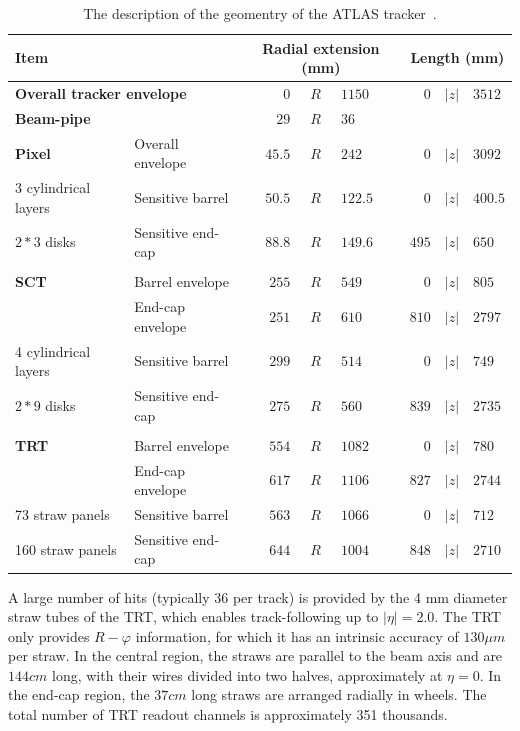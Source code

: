 \begin{table}
\centering
\begin{tabular}{ll | r@{$<$}c@{$<$}l | r@{$<$}c@{$<$}l} \hline\hline
\multicolumn{2}{l|}{\bf Item} & \multicolumn{3}{c|}{\bf Radial extension (mm)} & \multicolumn{3}{c}{\bf Length (mm)} \\\hline
\multicolumn{2}{l|}{\bf Overall tracker envelope} & $0$&$R$&$1150$ & $0$&$|z|$&$3512$ \\
\multicolumn{2}{l|}{\bf Beam-pipe} & $29$&$R$&$36$ & \multicolumn{3}{c}{}\\\hline
{\bf Pixel} & Overall envelope & $45.5$&$R$&$242$ & $0$&$|z|$&$3092$ \\
3 cylindrical layers & Sensitive barrel & $50.5$&$R$&$122.5$ & $0$&$|z|$&$400.5$ \\
$2*3$ disks & Sensitive end-cap & $88.8$&$R$&$149.6$ & $495$&$|z|$&$650$ \\
\multicolumn{2}{l|}{} & \multicolumn{3}{c|}{} & \multicolumn{3}{c}{}\\
{\bf SCT} & Barrel envelope & $255$&$R$&$549$ & $0$&$|z|$&$805$ \\
 & End-cap envelope & $251$&$R$&$610$ & $810$&$|z|$&$2797$ \\
4 cylindrical layers & Sensitive barrel & $299$&$R$&$514$ & $0$&$|z|$&$749$ \\
$2*9$ disks & Sensitive end-cap & $275$&$R$&$560$ & $839$&$|z|$&$2735$ \\
\multicolumn{2}{l|}{} & \multicolumn{3}{c|}{} & \multicolumn{3}{c}{}\\
{\bf TRT} & Barrel envelope & $554$&$R$&$1082$ & $0$&$|z|$&$780$ \\
 & End-cap envelope & $617$&$R$&$1106$ & $827$&$|z|$&$2744$ \\
73 straw panels & Sensitive barrel & $563$&$R$&$1066$ & $0$&$|z|$&$712$ \\
160 straw panels & Sensitive end-cap & $644$&$R$&$1004$ & $848$&$|z|$&$2710$ \\
\hline\hline
\end{tabular}
\caption{The description of the geomentry of the ATLAS tracker~\cite{lib:ATLASdet}.}
\label{tab:ATLAS_tracker}
\end{table}

A large number of hits (typically 36 per track) is provided by the 4 mm diameter straw tubes
of the TRT, which enables track-following up to $|\eta|=2.0$. The TRT only provides $R-\varphi$ information, for which it has an intrinsic accuracy of $130 \mu m$ per straw. In the central region, the straws are
parallel to the beam axis and are $144 cm$ long, with their wires divided into two halves, approximately at $\eta = 0$. In the end-cap region, the $37 cm$ long straws are arranged radially in wheels. The
total number of TRT readout channels is approximately 351 thousands.

